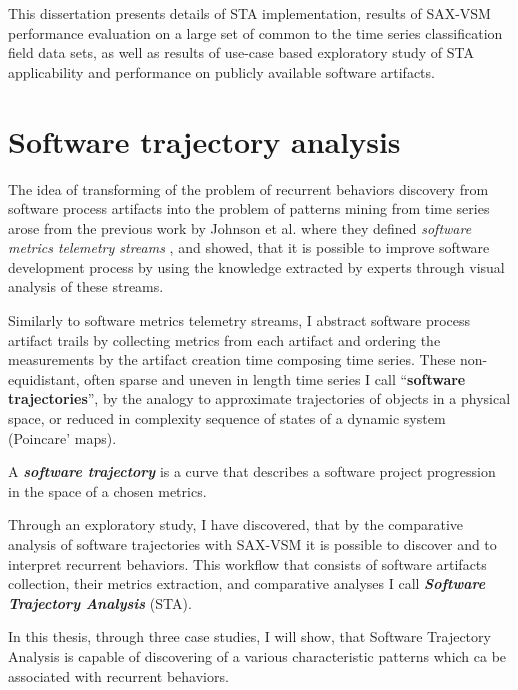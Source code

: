 This dissertation presents details of STA implementation, results of SAX-VSM performance evaluation on a large 
set of common to the time series classification field data sets, as well as results of use-case based exploratory 
study of STA applicability and performance on publicly available software artifacts.


\section{Software trajectory analysis}\label{section_trajectory_definition}
The idea of transforming of the problem of recurrent behaviors discovery from software process artifacts into 
the problem of patterns mining from time series arose from the previous work by Johnson et al. 
where they defined \textit{software metrics telemetry streams} \cite{citeulike:12550871}, 
and showed, that it is possible to improve software development process by using the knowledge extracted by 
experts through visual analysis of these streams.
 
Similarly to software metrics telemetry streams, I abstract software process artifact trails by collecting 
metrics from each artifact and ordering the measurements by the artifact creation time composing time series.
These non-equidistant, often sparse and uneven in length time series I call 
``\textbf{software trajectories}'', by the analogy to approximate trajectories of objects in 
a physical space, or reduced in complexity sequence of states of a dynamic system (Poincare' maps).
\begin{defn}\label{def_trajectory}
A \textbf{\textit{software trajectory}} is a curve that describes a software project progression in the space 
of a chosen metrics.
\end{defn}

Through an exploratory study, I have discovered, that by the comparative analysis of software trajectories 
with SAX-VSM it is possible to discover and to interpret recurrent behaviors. This workflow that 
consists of software artifacts collection, their metrics extraction, and comparative analyses I call 
\textit{\textbf{Software Trajectory Analysis}} (STA). 

In this thesis, through three case studies, I will show, that Software Trajectory Analysis is capable 
of discovering of a various characteristic patterns which ca be associated with recurrent behaviors.


%
%
